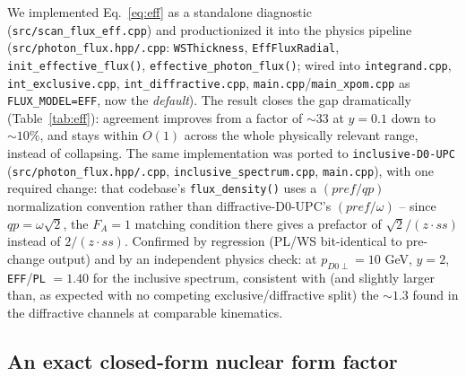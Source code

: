 \documentclass[11pt]{article}
\begin{document}
We implemented Eq.~\eqref{eq:eff} as a standalone diagnostic
(\texttt{src/scan\_flux\_eff.cpp}) and productionized it into the physics
pipeline (\texttt{src/photon\_flux.hpp/.cpp}: \texttt{WSThickness},
\texttt{EffFluxRadial}, \texttt{init\_effective\_flux()},
\texttt{effective\_photon\_flux()}; wired into
\texttt{integrand.cpp}, \texttt{int\_exclusive.cpp},
\texttt{int\_diffractive.cpp}, \texttt{main.cpp}/\texttt{main\_xpom.cpp}
as \texttt{FLUX\_MODEL=EFF}, now the \emph{default}). The result closes the
gap dramatically (Table~\ref{tab:eff}): agreement
improves from a factor of $\sim33$ at $y=0.1$ down to $\sim10\%$, and stays
within $O(1)$ across the whole physically relevant range, instead of
collapsing. The same implementation was ported to \texttt{inclusive-D0-UPC}
(\texttt{src/photon\_flux.hpp/.cpp}, \texttt{inclusive\_spectrum.cpp},
\texttt{main.cpp}), with one required change: that codebase's
\texttt{flux\_density()} uses a $(pref/qp)$ normalization convention rather
than diffractive-D0-UPC's $(pref/\omega)$ -- since $qp=\omega\sqrt2$, the
$F_A{=}1$ matching condition there gives a prefactor of $\sqrt2/(z\cdot ss)$
instead of $2/(z\cdot ss)$. Confirmed by regression (PL/WS bit-identical to
pre-change output) and by an independent physics check: at $p_{D0\perp}=10$
GeV, $y=2$, \texttt{EFF}/\texttt{PL} $=1.40$ for the inclusive spectrum,
consistent with (and slightly larger than, as expected with no competing
exclusive/diffractive split) the $\sim1.3$ found in the diffractive
channels at comparable kinematics.

\subsection{An exact closed-form nuclear form factor}
\end{document}

